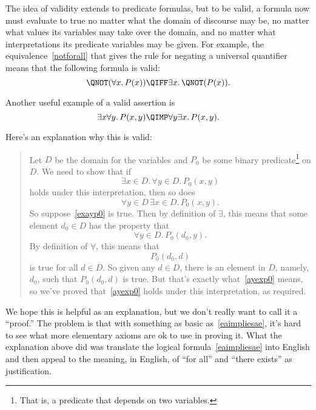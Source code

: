 The idea of validity  extends to predicate
formulas, but to be valid, a formula now must evaluate to true no
matter what the domain of discourse may be, no matter what values its
variables may take over the domain, and no matter what interpretations
its predicate variables may be given.  For example, the
equivalence~\eqref{notforall} that gives the rule for negating a
universal quantifier  means that the following formula is valid:
\begin{equation}\label{notforall-equiv}
\QNOT(\forall x.\, P(x)) 
\QIFF  
\exists x.\, \QNOT(P(x)).
\end{equation}

Another useful example of a valid assertion is
\begin{equation}\label{eaimpliesae}
\exists x \forall y.\, P(x,y) \QIMP \forall y \exists x.\, P(x,y).
\end{equation}

Here's an explanation why this is valid:

\begin{quote}
Let $D$ be the domain for the variables and $P_0$ be some
binary predicate\footnote{That is, a predicate that depends on two variables.}
on $D$.  We need to show that if
\begin{equation}\label{exayp0}
\exists x \in D.\, \forall y \in D.\, P_0(x,y)
\end{equation}
holds under this interpretation, then so does
\begin{equation}\label{ayexp0}
\forall y \in D\, \exists x \in D.\, P_0(x,y).
\end{equation}
So suppose~\eqref{exayp0} is true.  Then by definition of $\exists$, this
means that some element $d_0 \in D$ has the property that
\[
\forall y \in D.\, P_0(d_0, y).
\]
By definition of $\forall$, this means that
\[
P_0(d_0,d)
\]
is true for all $d \in D$.  So given any $d \in D$, there is an element in
$D$, namely, $d_0$, such that $P_0(d_0,d)$ is true.  But that's exactly
what~\eqref{ayexp0} means, so we've proved that~\eqref{ayexp0} holds under
this interpretation, as required.
\end{quote}

We hope this is helpful as an explanation, but we don't really want to
call it a ``proof.''  The problem is that with something as basic
as~\eqref{eaimpliesae}, it's hard to see what more elementary axioms
are ok to use in proving it.  What the explanation above did was
translate the logical formula~\eqref{eaimpliesae} into English and
then appeal to the meaning, in English, of ``for all'' and ``there
exists'' as justification.

